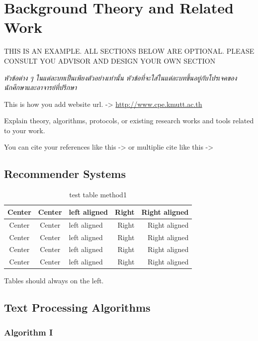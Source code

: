 \documentclass[12pt,oneside,openright,a4paper]{cpe-english-project}
\begin{document}
\chapter{Background Theory and Related Work}

THIS IS AN EXAMPLE. ALL SECTIONS BELOW ARE OPTIONAL. PLEASE CONSULT YOU ADVISOR AND DESIGN YOUR OWN SECTION

\emph{\textthai{หัวข้อต่าง ๆ ในแต่ละบทเป็นเพียงตัวอย่างเท่านั้น หัวข้อที่จะใส่ในแต่ละบทขึ้นอยู่กับโปรเจคของนักศึกษาและอาจารย์ที่ปรึกษา}}

This is how you add website url. -> \url{http://www.cpe.kmutt.ac.th}

Explain theory, algorithms, protocols, or existing research works and tools related to your work.

You can cite your references like this -> \cite{santi05b}  or multiplie cite like this -> \cite{bworld,hypersense}

\section{Recommender Systems}

\begin{table}[!h]
\caption{test table method1}\label{tbl:method1}
\begin{tabular}{c|c|l|rr} \hline\hline
Center & Center & left aligned & Right & Right aligned \\ \hline\hline
Center & Center & left aligned & Right & Right aligned \\ \hline
Center & Center & left aligned & Right & Right aligned \\ 
Center & Center & left aligned & Right & Right aligned \\ \hline
Center & Center & left aligned & Right & Right aligned \\ \hline\hline
\end{tabular}
\end{table}

Tables should always on the left.
\section{Text Processing Algorithms}
\subsection{Algorithm I}
\end{document}
